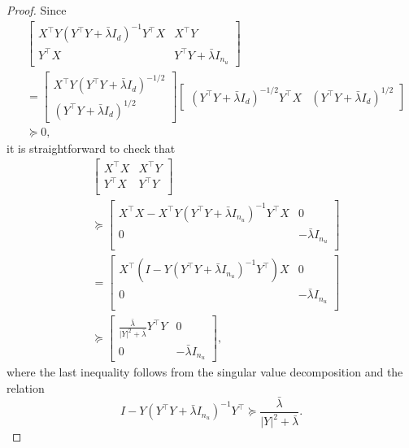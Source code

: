 \documentclass[11pt]{article}
\theoremstyle{plain}
\theoremstyle{definition}
\theoremstyle{remark}
\begin{document}
\begin{proof}
Since
\begin{align*}
    &\begin{bmatrix}
    X^\top Y(Y^{\top}Y+\bar\lambda I_d)^{-1} Y^{\top} X & X^{\top}Y \\
    Y^\top X & Y^{\top}Y+\bar\lambda I_{n_u}
    \end{bmatrix}\\
    &=
    \begin{bmatrix}
    X^\top Y(Y^{\top}Y+\bar\lambda I_d)^{-1/2}\\ 
    (Y^{\top}Y+\bar\lambda I_d)^{1/2}
    \end{bmatrix}
    \begin{bmatrix}
    (Y^{\top}Y+\bar\lambda I_d)^{-1/2}Y^\top X& 
    (Y^{\top}Y+\bar\lambda I_d)^{1/2}
    \end{bmatrix}\\
    &\succeq 0,
\end{align*}
it is straightforward to check that
\begin{align*}
    &\begin{bmatrix}
     X^{\top}X & X^{\top}Y \\
    Y^\top X & Y^{\top}Y\\
    \end{bmatrix}\\
    &\succeq 
    \begin{bmatrix}
        X^{\top}X-X^{\top}Y(Y^{\top}Y+\bar\lambda I_{n_u})^{-1}Y^{\top}X & 0\\
        0 & -\bar\lambda I_{n_u}\\
    \end{bmatrix}\\
    &= 
    \begin{bmatrix}
        X^{\top}(I-Y(Y^{\top}Y+\bar\lambda I_{n_u})^{-1}Y^{\top})X & 0\\
        0 & -\bar\lambda I_{n_u}\\
    \end{bmatrix}\\
    &\succeq
    \begin{bmatrix}
    \frac{\bar\lambda}{|Y|^2+\bar\lambda}Y^\top Y & 0\\
    0 & -\bar\lambda I_{n_u}
    \end{bmatrix},
\end{align*}
where the last inequality follows from the singular value decomposition and the relation
\[
I-Y(Y^{\top}Y+\bar\lambda I_{n_u})^{-1}Y^{\top} \succeq \frac{\bar\lambda}{|Y|^2+\bar\lambda}.
\]
\end{proof}
\end{document}
